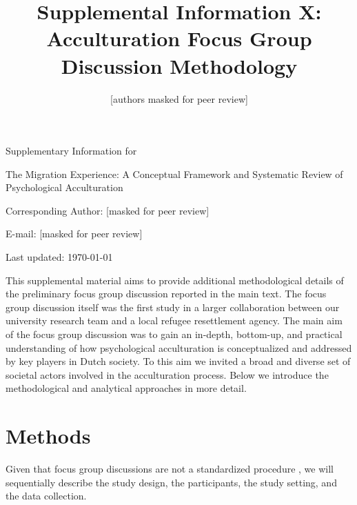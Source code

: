 \documentclass[man, 12pt, a4paper]{apa7}
\title{Supplemental Information X: Acculturation Focus Group Discussion Methodology}
\author{[authors masked for peer review]}
\begin{document}
\begin{titlepage}
	{\noindent\Large Supplementary Information for \par}
	\vspace{0.5cm}
	{\noindent\Large The Migration Experience: A Conceptual Framework and Systematic Review of Psychological Acculturation\par}
	\vspace{1.5cm}
	{\noindent\LARGE\bfseries \thetitle \par}
	\vspace{2cm}
	{\noindent\Large\itshape \theauthor \par}
	\vfill
	\noindent Corresponding Author: [masked for peer review]\par
	\noindent E-mail: [masked for peer review]\par
	\vfill

	{\noindent Last updated: \today\par}
\end{titlepage}

\begin{center}
   \textbf{\thetitle} 
\end{center}

This supplemental material aims to provide additional methodological details of the preliminary focus group discussion reported in the main text. The focus group discussion itself was the first study in a larger collaboration between our university research team and a local refugee resettlement agency. The main aim of the focus group discussion was to gain an in-depth, bottom-up, and practical understanding of how psychological acculturation is conceptualized and addressed by key players in Dutch society. To this aim we invited a broad and diverse set of societal actors involved in the acculturation process. Below we introduce the methodological and analytical approaches in more detail.

\section{Methods}

Given that focus group discussions are not a standardized procedure \citep[][]{Morgan2010, Barbour2001}, we will sequentially describe the study design, the participants, the study setting, and the data collection. 
\end{document}
